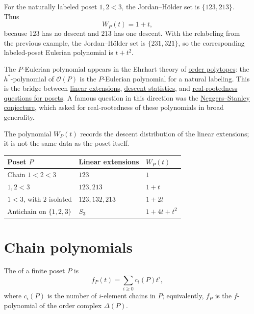 \begin{example*}
For the naturally labeled poset $1,2\lt 3$, the Jordan--Hölder set is
$\{123,213\}$.  Thus
\[
  W_P(t)=1+t,
\]
because $123$ has no descent and $213$ has one descent.  With the relabeling
from the previous example, the Jordan--Hölder set is $\{231,321\}$, so the
corresponding labeled-poset Eulerian polynomial is $t+t^2$.
\end{example*}

The $P$-Eulerian polynomial appears in the Ehrhart theory of
\hyperref[orderPolytope]{order polytopes}: the $h^*$-polynomial of
$\mathcal{O}(P)$ is the $P$-Eulerian polynomial for a natural labeling.  This
is the bridge between \hyperref[linearExtension]{linear extensions},
\hyperref[descentSet]{descent statistics}, and \hyperref[posetRealRooted]{real-rootedness
questions for posets}.  A famous question in this direction was the
\hyperref[neggersStanleyConjecture]{Neggers--Stanley conjecture}, which asked
for real-rootedness of these polynomials in broad generality.

\begin{example*}
The polynomial \(W_P(t)\) records the descent distribution of the linear
extensions; it is not the same data as the poset itself.

\begin{tabular}{lll}
\toprule
Poset \(P\) & Linear extensions & \(W_P(t)\) \\
\midrule
Chain \(1\lt 2\lt 3\) & \(123\) & \(1\) \\
\(1,2\lt 3\) & \(123,213\) & \(1+t\) \\
\(1\lt 3\), with \(2\) isolated & \(123,132,213\) & \(1+2t\) \\
Antichain on \(\{1,2,3\}\) & \(S_3\) & \(1+4t+t^2\) \\
\bottomrule
\end{tabular}
\end{example*}

\section[posetChainPolynomials]{Chain polynomials}

The \label{chainPolynomial} of a finite poset $P$ is
\[
 f_P(t)=\sum_{i\geq0}c_i(P)t^i,
\]
where $c_i(P)$ is the number of $i$-element chains in $P$; equivalently,
$f_P$ is the $f$-polynomial of the order complex $\Delta(P)$.

